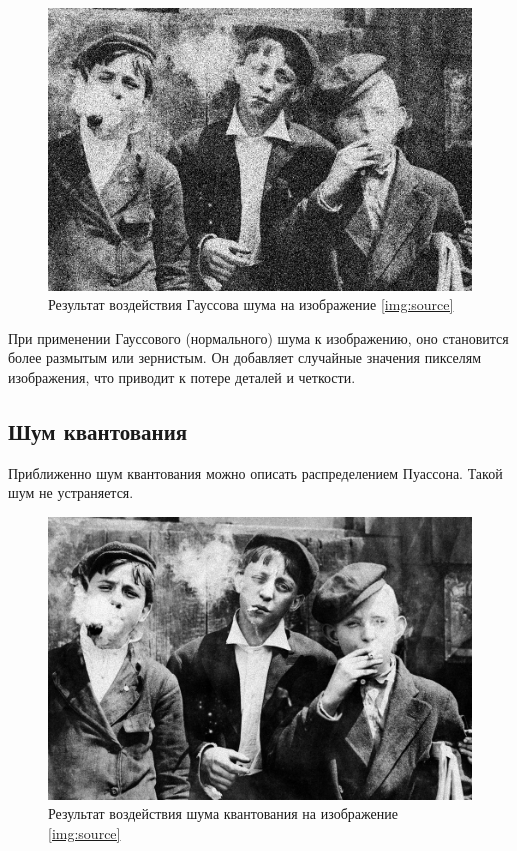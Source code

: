 \begin{figure}[ht!!]
    \centering
    \includegraphics[width=\textwidth]{../Noisy_images/Gaussian_noise.jpg}
    \caption{Результат воздействия Гауссова шума на изображение \ref{img:source}}
    \label{img:gaussian_noise}
\end{figure}
\FloatBarrier

При применении Гауссового (нормального) шума к изображению, оно становится более размытым или зернистым. Он добавляет случайные значения пикселям изображения, что приводит к потере деталей и четкости.

\subsection{Шум квантования}
Приближенно шум квантования можно описать распределением Пуассона. Такой шум не устраняется.

\begin{figure}[ht!!]
    \centering
    \includegraphics[width=\textwidth]{../Noisy_images/Poisson_Noise.jpg}
    \caption{Результат воздействия шума квантования на изображение \ref{img:source}}
    \label{img:poisson_noise}
\end{figure}
\FloatBarrier

